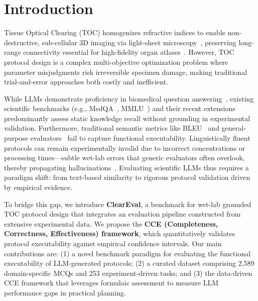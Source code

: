 \documentclass[runningheads]{llncs}
\begin{document}
\section{Introduction}
Tissue Optical Clearing (TOC) homogenizes refractive indices to enable non-destructive, sub-cellular 3D imaging via light-sheet microscopy~\cite{ueda2020tissue,chung2013clarity}, preserving long-range connectivity essential for high-fidelity organ atlases~\cite{wang2025advances,richardson2025unlocking}. However, TOC protocol design is a complex multi-objective optimization problem where parameter misjudgments risk irreversible specimen damage, making traditional trial-and-error approaches both costly and inefficient.

While LLMs demonstrate proficiency in biomedical question answering~\cite{singhal2023medpalm}, existing scientific benchmarks (e.g., MedQA~\cite{jin2021disease}, MMLU~\cite{hendrycks2021mmlu}) and their recent extensions~\cite{zhang2025benchmarking,wang2025cardbiomedbench,feng2024mediq} predominantly assess static knowledge recall without grounding in experimental validation. Furthermore, traditional semantic metrics like BLEU~\cite{papineni2002bleu} and general-purpose evaluators~\cite{liu2023geval,li2024survey} fail to capture functional executability. Linguistically fluent protocols can remain experimentally invalid due to incorrect concentrations or processing times—subtle wet-lab errors that generic evaluators often overlook, thereby propagating hallucinations~\cite{bang2025hallulens,zhang2025survey}. Evaluating scientific LLMs thus requires a paradigm shift: from text-based similarity to rigorous protocol validation driven by empirical evidence.

To bridge this gap, we introduce \textbf{ClearEval}, a benchmark for wet-lab grounded TOC protocol design that integrates an evaluation pipeline constructed from extensive experimental data. We propose the \textbf{CCE (Completeness, Correctness, Effectiveness) framework}, which quantitatively validates protocol executability against empirical confidence intervals. Our main contributions are: (1) a novel benchmark paradigm for evaluating the functional executability of LLM-generated protocols; (2) a curated dataset comprising 2,589 domain-specific MCQs and 253 experiment-driven tasks; and (3) the data-driven CCE framework that leverages formulaic assessment to measure LLM performance gaps in practical planning.
\end{document}
